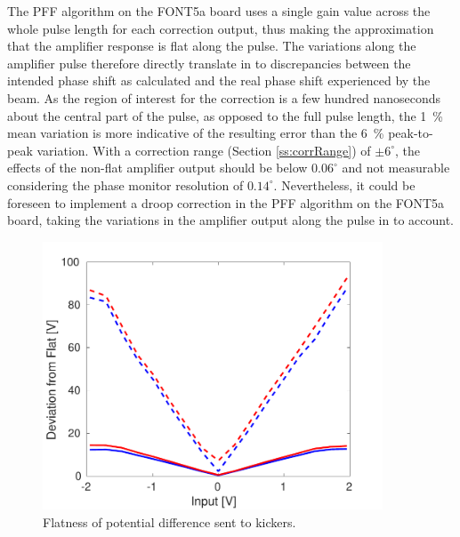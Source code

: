 The PFF algorithm on the FONT5a board uses a single gain value across the whole pulse length for each correction output, thus making the approximation that the amplifier response is flat along the pulse. The variations along the amplifier pulse therefore directly translate in to discrepancies between the intended phase shift as calculated and the real phase shift experienced by the beam. As the region of interest for the correction is a few hundred nanoseconds about the central part of the pulse, as opposed to the full pulse length, the 1~\% mean variation is more indicative of the resulting error than the 6~\% peak-to-peak variation. With a correction range (Section \ref{ss:corrRange}) of \(\pm6^\circ\), the effects of the non-flat amplifier output should be below \(0.06^\circ\) and not measurable considering the phase monitor resolution of \(0.14^\circ\). Nevertheless, it could be foreseen to implement a droop correction in the PFF algorithm on the FONT5a board, taking the variations in the amplifier output along the pulse in to account.

\begin{figure}
  \centering
  \includegraphics[width=0.9\textwidth]{Figures/commissioning/AmpFlatness}
  \caption{Flatness of potential difference sent to kickers.}
  \label{f:ampFlatness}
\end{figure}


